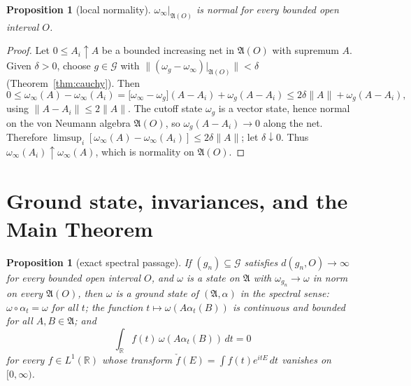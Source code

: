 \documentclass[11pt,a4paper]{article}
\theoremstyle{plain}
\newtheorem{proposition}[theorem]{Proposition}
\theoremstyle{definition}
\theoremstyle{plain}
\theoremstyle{definition}
\newcommand{\R}{\mathbb{R}}
\newcommand{\A}{\mathfrak{A}}
\newcommand{\G}{\mathcal{G}}
\begin{document}
\begin{proposition}[local normality]\label{prop:normal}
$\omega_\infty|_{\A(O)}$ is normal for every bounded open interval $O$.
\end{proposition}

\begin{proof}
Let $0\le A_i\uparrow A$ be a bounded increasing net in $\A(O)$ with supremum $A$. Given
$\delta>0$, choose $g\in\G$ with
$\|(\omega_g-\omega_\infty)|_{\A(O)}\|<\delta$ (Theorem~\ref{thm:cauchy}). Then
\[
 0\le\omega_\infty(A)-\omega_\infty(A_i)
 =\bigl[\omega_\infty-\omega_g\bigr](A-A_i)+\omega_g(A-A_i)
 \le2\delta\|A\|+\omega_g(A-A_i),
\]
using $\|A-A_i\|\le2\|A\|$. The cutoff state $\omega_g$ is a vector state, hence normal on
the von Neumann algebra $\A(O)$, so $\omega_g(A-A_i)\to0$ along the net. Therefore
$\limsup_i[\omega_\infty(A)-\omega_\infty(A_i)]\le2\delta\|A\|$; let
$\delta\downarrow0$. Thus $\omega_\infty(A_i)\uparrow\omega_\infty(A)$, which is normality
on $\A(O)$.
\end{proof}

\section{Ground state, invariances, and the Main Theorem}\label{sec:ground}

\begin{proposition}[exact spectral passage]\label{prop:spectral}
If $(g_n)\subseteq\G$ satisfies $d(g_n,O)\to\infty$ for every bounded open interval $O$, and
$\omega$ is a state on $\A$ with $\omega_{g_n}\to\omega$ in norm on every $\A(O)$, then $\omega$
is a ground state of
$(\A,\alpha)$ in the spectral sense: $\omega\circ\alpha_t=\omega$ for all $t$; the
function $t\mapsto\omega(A\alpha_t(B))$ is continuous and bounded for all $A,B\in\A$; and
\[
 \int_\R f(t)\,\omega(A\alpha_t(B))\,dt=0
\]
for every $f\in L^1(\R)$ whose transform $\check f(E)=\int f(t)e^{itE}\,dt$ vanishes on
$[0,\infty)$.
\end{proposition}
\end{document}
